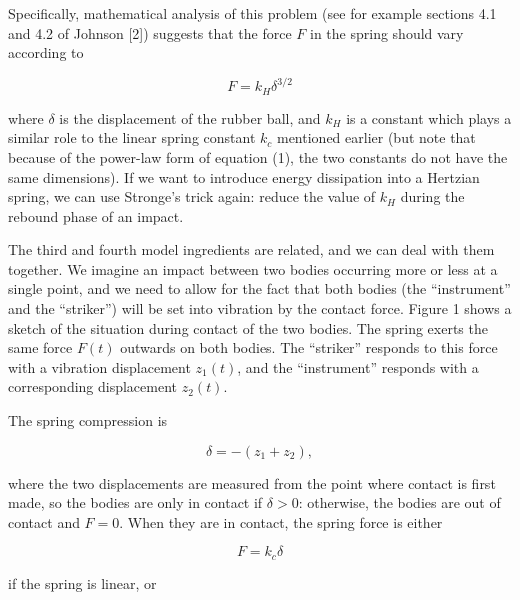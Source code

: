   Specifically, mathematical analysis of this problem (see for example sections 
  4.1 and 4.2 of Johnson [2]) suggests that the force $F$ in the spring should 
  vary according to 

  \begin{equation*}F=k_H \delta^{3/2} \tag{1}\end{equation*} 

  \noindent{}where $\delta$ is the displacement of the rubber ball, and $k_H$ 
  is a constant which plays a similar role to the linear spring constant $k_c$ 
  mentioned earlier (but note that because of the power-law form of equation 
  (1), the two constants do not have the same dimensions). If we want to 
  introduce energy dissipation into a Hertzian spring, we can use Stronge's 
  trick again: reduce the value of $k_H$ during the rebound phase of an impact. 

  The third and fourth model ingredients are related, and we can deal with them 
  together. We imagine an impact between two bodies occurring more or less at a 
  single point, and we need to allow for the fact that both bodies (the 
  ``instrument'' and the ``striker'') will be set into vibration by the contact 
  force. Figure 1 shows a sketch of the situation during contact of the two 
  bodies. The spring exerts the same force $F(t)$ outwards on both bodies. The 
  ``striker'' responds to this force with a vibration displacement $z_1(t)$, 
  and the ``instrument'' responds with a corresponding displacement $z_2(t)$. 


  The spring compression is 

  \begin{equation*}\delta=-(z_1+z_2), \tag{2}\end{equation*} 

  \noindent{}where the two displacements are measured from the point where 
  contact is first made, so the bodies are only in contact if $\delta > 0$: 
  otherwise, the bodies are out of contact and $F=0$. When they are in contact, 
  the spring force is either 

  \begin{equation*}F=k_c\delta \tag{3}\end{equation*} 

  \noindent{}if the spring is linear, or 

